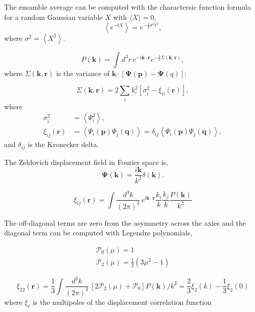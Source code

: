 \documentclass[a4paper,11pt]{article}
\begin{document}
The ensamble average can be computed with the charactersic function formula
for a random Gaussian variable $X$ with $\langle X \rangle = 0$,
\begin{equation}
  \left\langle e^{-t X} \right\rangle = e^{-\frac{1}{2} \sigma^2 t^2},
\end{equation}
where $\sigma^2 = \left\langle X^2 \right\rangle$.

\begin{equation}
  P(\bm{k}) = \int d^3 r \, e^{-i \bm{k} \cdot \bm{r}}
    e^{-\frac{1}{2} \Sigma(\bm{k}, \bm{r})},
\end{equation}
where $\Sigma(\bm{k}, \bm{r})$ is the variance of $\bm{k} \cdot \left[
  \bm{\Psi}(\bm{p}) - \bm{\Psi}(q) \right]$:

\begin{equation}
  \Sigma(\bm{k}, \bm{r}) = 2 \sum_i k_i^2 \left[ \sigma_i^2 - \xi_{ii}(\bm{r}) \right],
\end{equation}
where
\begin{align}
  \sigma^2_i       &= \left\langle \Psi_i^2 \right\rangle,\\
  \xi_{ij}(\bm{r}) &= \left\langle \Psi_i(\bm{p}) \Psi_j(\bm{q}) \right\rangle
                   = \delta_{ij} \left\langle \Psi_i(\bm{p}) \Psi_j(\bm{q}) \right\rangle,
\end{align}
and $\delta_{ij}$ is the Kronecker delta.

The Zeldovich displacement field in Fourier space is,
\begin{equation}
  \bm{\Psi}(\bm{k}) = \frac{i\bm{k}}{k^2} \delta(\bm{k}).
\end{equation}



\begin{equation}
  \xi_{ij}(\bm{r}) = \int \frac{d^3 k}{(2\pi)^3}\,
                    e^{i\bm{k} \cdot \bm{r}} \frac{k_i}{k} \frac{k_j}{k}
                    \frac{P(\bm{k})}{k^2}
\end{equation}

The off-diagonal terms are zero from the asymmetry across the axies
and the diagonal term can be computed with Legendre polynomials,

\begin{align}
  \mathcal{P}_0(\mu) = 1\\
  \mathcal{P}_2(\mu) = \frac{1}{2} \left( 3 \mu^2 - 1 \right)
\end{align}


\begin{equation}
  \xi_{22}(\bm{r}) = \frac{1}{3} \int \frac{d^3 k}{(2\pi)^3} \,
             \left[ 2 \mathcal{P}_2(\mu) + \mathcal{P}_0 \right] P(\bm{k})/k^2
             = \frac{2}{3}  \xi_2(k) - \frac{1}{3} \xi_2(0)
\end{equation}
where $\xi_\ell$ is the multipoles of the displacement correlation function
\end{document}
